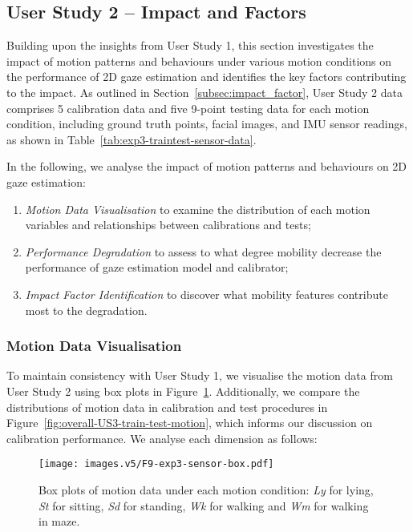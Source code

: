 \subsection{User Study 2 -- Impact and Factors}
Building upon the insights from User Study 1, this section investigates the impact of motion patterns and behaviours under various motion conditions on the performance of 2D gaze estimation and identifies the key factors contributing to the impact. As outlined in Section~\ref{subsec:impact_factor}, User Study 2 data comprises 5 calibration data and five 9-point testing data for each motion condition, including ground truth points, facial images, and IMU sensor readings, as shown in Table~\ref{tab:exp3-traintest-sensor-data}. 

In the following, we analyse the impact of motion patterns and behaviours on 2D gaze estimation:
\begin{enumerate}
    \item \textit{Motion Data Visualisation} to examine the distribution of each motion variables and relationships between calibrations and tests; 
    \item \textit{Performance Degradation} to assess to what degree mobility decrease the performance of gaze estimation model and calibrator; 
    \item \textit{Impact Factor Identification} to discover what mobility features contribute most to the degradation. 
\end{enumerate}


\subsubsection{Motion Data Visualisation}

To maintain consistency with User Study 1, we visualise the motion data from User Study 2 using box plots in Figure~\ref{fig:overall-US3-sensor-data}. Additionally, we compare the distributions of motion data in calibration and test procedures in Figure~\ref{fig:overall-US3-train-test-motion}, which informs our discussion on calibration performance. We analyse each dimension as follows:

\begin{figure}[!htbp]
    \centering
    \texttt{[image: images.v5/F9-exp3-sensor-box.pdf]}
    \caption{Box plots of motion data under each motion condition: \textit{Ly} for lying, \textit{St}  for sitting, \textit{Sd}  for standing, \textit{Wk} for walking and \textit{Wm} for walking in maze. }
    \label{fig:overall-US3-sensor-data}
\end{figure}


